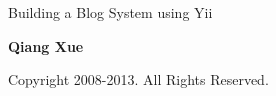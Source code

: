 
\thispagestyle{empty}
\begin{center}
    \bfseries \rule{0cm}{1.5cm} \Huge
    Building a Blog System using Yii
     \vspace{1.5cm}
\end{center}

\begin{center}
    \bfseries \Large Qiang Xue
\end{center}


\begin{center}
   Copyright 2008-2013. All Rights Reserved.
\end{center}

\vfill

\pagebreak \thispagestyle{empty} \cleardoublepage
